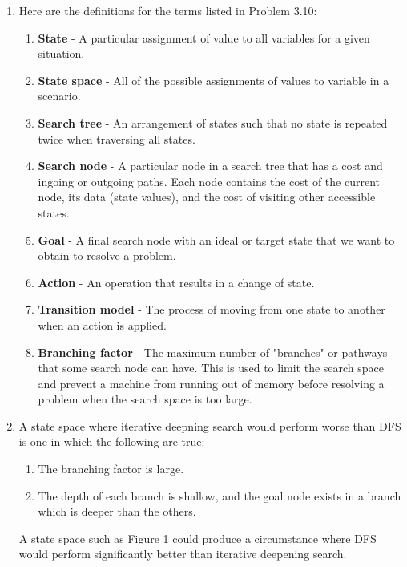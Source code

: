 \documentclass{article}
\begin{document}
\begin{enumerate}
    \item %
    Here are the definitions for the terms listed in Problem 3.10:
    \begin{enumerate}
        \item \textbf{State} - A particular assignment of value to all variables for a given situation.
        \item \textbf{State space} - All of the possible assignments of values to variable in a scenario.
        \item \textbf{Search tree} - An arrangement of states such that no state is repeated twice when traversing all states.
        \item \textbf{Search node} - A particular node in a search tree that has a cost and ingoing or outgoing paths. Each node contains the cost of the current node, its data (state values), and the cost of visiting other accessible states.
        \item \textbf{Goal} - A final search node with an ideal or target state that we want to obtain to resolve a problem.
        \item \textbf{Action} - An operation that results in a change of state.
        \item \textbf{Transition model} - The process of moving from one state to another when an action is applied.
        \item \textbf{Branching factor} - The maximum number of "branches" or pathways that some search node can have. This is used to limit the search space and prevent a machine from running out of memory before resolving a problem when the search space is too large.
    \end{enumerate}
    \item %
    A state space where iterative deepning search would perform worse than DFS is one in which the following are true:
    \begin{enumerate}
        \item The branching factor is large.
        \item The depth of each branch is shallow, and the goal node exists in a branch which is deeper than the others.
    \end{enumerate}
    A state space such as Figure 1 could produce a circumstance where DFS would perform significantly better than iterative deepening search.

\end{enumerate}
\end{document}
